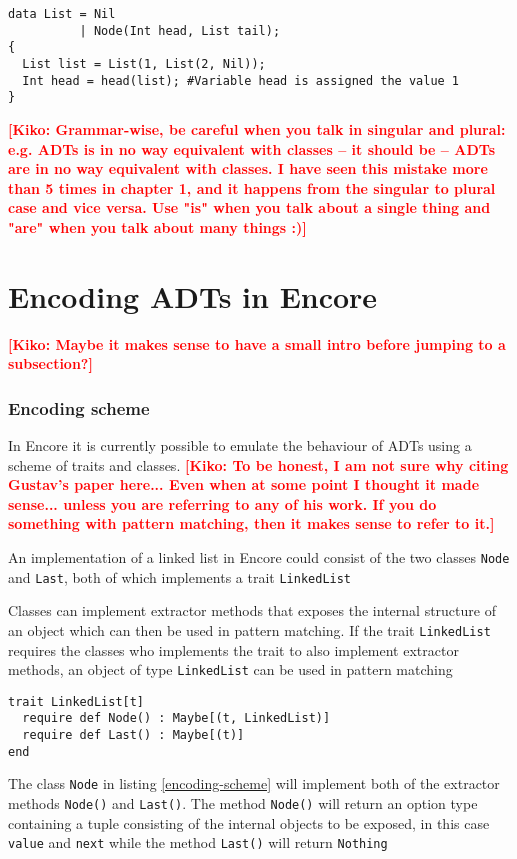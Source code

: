 \documentclass[10pt]{report}
\newcommand{\KIKO}[1]{\textcolor{red}{\textbf{[Kiko: #1]}}}
\def\code#1{\texttt{#1}} %
\begin{document}
\begin{lstlisting}[language=encore,caption={Accessor funtion in ABS},label=abs-list]
data List = Nil
          | Node(Int head, List tail);
{
  List list = List(1, List(2, Nil));
  Int head = head(list); #Variable head is assigned the value 1
}
\end{lstlisting}


\KIKO{Grammar-wise, be careful when you talk in singular and plural: e.g. ADTs is in no way equivalent with classes -- it should be -- ADTs are in no way equivalent with classes. I have seen this mistake more than
5 times in chapter 1, and it happens from the singular to plural case and vice versa. Use "is" when you talk about a single thing and "are" when you talk about many things :)}

\chapter{Encoding ADTs in Encore}
\KIKO{Maybe it makes sense to have a small intro before jumping to a subsection?}
\subsection{Encoding scheme}
\par{In Encore it is currently possible to emulate the behaviour of ADTs using a scheme of traits and classes.}\cite{gustavL}
\KIKO{To be honest, I am not sure why citing Gustav's paper here... Even when at some point I thought it made sense... unless you are referring to any of his work. If you do something with pattern matching, then it makes sense to refer to it.}
\par{An implementation of a linked list in Encore could consist of the two classes \code{Node} and \code{Last}, both of which implements a trait \code{LinkedList}}
\par{Classes can implement extractor methods that exposes the internal structure of an object which can then be used in pattern matching. If the trait \code{LinkedList} requires the classes who implements the trait to also implement extractor methods, an object of type \code{LinkedList} can be used in pattern matching}

\begin{lstlisting}[language=encore,caption={trait LinkedList that requires classes to implement destructor methods}]
trait LinkedList[t]
  require def Node() : Maybe[(t, LinkedList)]
  require def Last() : Maybe[(t)]
end
\end{lstlisting}
\par{The class \code{Node} in listing \ref{encoding-scheme} will implement both of the extractor methods \code{Node()} and \code{Last()}. The method \code{Node()} will return an option type containing a tuple consisting of the internal objects to be exposed, in this case \code{value} and \code{next} while the method \code{Last()} will return \code{Nothing}}
\end{document}
